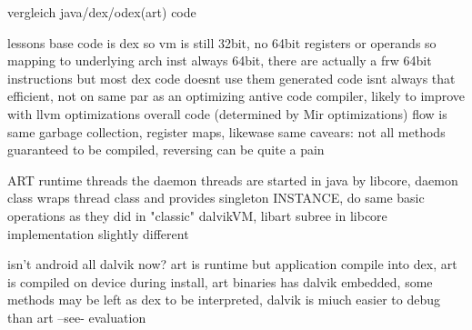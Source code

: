 vergleich java/dex/odex(art) code
\newline

lessons
base code is dex so vm is still 32bit, no 64bit registers or operands so mapping to underlying arch inst always 64bit, there are actually a frw 64bit instructions but most dex code doesnt use them
generated code isnt always that efficient, not on same par as an optimizing antive code compiler, likely to improve with llvm optimizations
overall code (determined by Mir optimizations) flow is same
garbage collection, register maps, likewase same
cavears: not all methods guaranteed to be compiled, reversing can be quite a pain
\newline

ART runtime threads
the daemon threads are started in java by libcore, daemon class wraps thread class and provides singleton INSTANCE, do same basic operations as they did in "classic" dalvikVM, libart subree in libcore implementation slightly different
\newline

isn't android all dalvik now?
art is runtime but application compile into dex, art is compiled on device during install, art binaries has dalvik embedded, some methods may be left as dex to be interpreted, dalvik is miuch easier to debug than art --see- evaluation \newline
\cite{andevconDalvikART}
%
